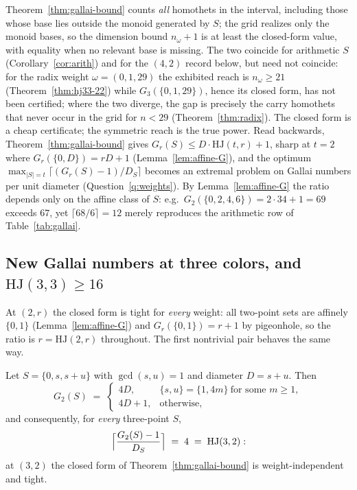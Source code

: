 \documentclass[12pt]{article}
\newcommand{\HJ}{\mathrm{HJ}}
\begin{document}
\begin{remark}\label{rem:closed-vs-reach}
Theorem~\ref{thm:gallai-bound} counts \emph{all} homothets in the
interval, including those whose base lies outside the monoid generated
by $S$; the grid realizes only the monoid bases, so the dimension bound
$n_{\omega}+1$ is at least the closed-form value, with equality when no
relevant base is missing. The two coincide for arithmetic $S$
(Corollary~\ref{cor:arith}) and for the $(4,2)$ record below, but need
not coincide: for the radix weight $\omega=(0,1,29)$ the exhibited
reach is $n_{\omega}\ge 21$ (Theorem~\ref{thm:hj33-22}) while
$G_{3}(\{0,1,29\})$, hence its closed form, has not been certified;
where the two diverge, the gap is precisely the carry homothets that
never occur in the grid for $n<29$ (Theorem~\ref{thm:radix}). The
closed form is a cheap certificate; the symmetric reach is the true
power. Read backwards, Theorem~\ref{thm:gallai-bound} gives
$G_{r}(S)\le D\cdot\HJ(t,r)+1$, sharp at $t=2$ where
$G_{r}(\{0,D\})=rD+1$ (Lemma~\ref{lem:affine-G}), and the optimum
$\max_{|S|=t}\lceil(G_{r}(S)-1)/D_{S}\rceil$ becomes an extremal
problem on Gallai numbers per unit diameter (Question~\ref{q:weights}).
By Lemma~\ref{lem:affine-G} the ratio depends only on the affine class
of $S$: e.g.\ $G_{2}(\{0,2,4,6\})=2\cdot 34+1=69$ exceeds $67$, yet
$\lceil 68/6\rceil=12$ merely reproduces the arithmetic row of
Table~\ref{tab:gallai}.
\end{remark}

\subsection{New Gallai numbers at three colors, and
\texorpdfstring{$\HJ(3,3)\ge 16$}{HJ(3,3) >= 16}}\label{sec:landscape}

At $(2,r)$ the closed form is tight for \emph{every} weight: all
two-point sets are affinely $\{0,1\}$ (Lemma~\ref{lem:affine-G}) and
$G_{r}(\{0,1\})=r+1$ by pigeonhole, so the ratio is $r=\HJ(2,r)$
throughout. The first nontrivial pair behaves the same way.

\begin{proposition}\label{prop:flat32}
Let $S=\{0,s,s+u\}$ with $\gcd(s,u)=1$ and diameter $D=s+u$. Then
\[
G_{2}(S)\;=\;
\begin{cases}
4D, & \{s,u\}=\{1,4m\}\ \text{for some } m\ge 1,\\[2pt]
4D+1, & \text{otherwise},
\end{cases}
\]
and consequently, for \emph{every} three-point $S$,
\[
\Bigl\lceil\frac{G_{2}(S)-1}{D_{S}}\Bigr\rceil\;=\;4\;=\;\HJ(3,2):
\]
at $(3,2)$ the closed form of Theorem~\ref{thm:gallai-bound} is
weight-independent and tight.
\end{proposition}
\end{document}
